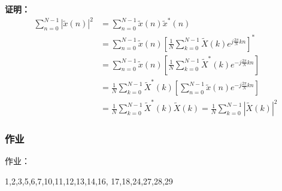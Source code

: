 \documentclass[notheorems,compress,mathserif,table]{beamer}
\begin{document}
\begin{frame}\frametitle{}%
\textbf{证明：}
\begin{equation*}
\begin{split}
\sum_{n=0}^{N-1}|\tilde{x}(n)|^{2}
&= \sum_{n=0}^{N-1}\tilde{x}(n)\tilde{x}^{*}(n)\\
&= \sum_{n=0}^{N-1}\tilde{x}(n)
\left[\frac{1}{N}\sum_{k=0}^{N-1}\tilde{X}(k)e^{j\frac{2\pi}{N}kn}\right]^{*}\\
&= \sum_{n=0}^{N-1}\tilde{x}(n)
\left[\frac{1}{N}\sum_{k=0}^{N-1}\tilde{X}^{*}(k)e^{-j\frac{2\pi}{N}kn}\right]\\
&= \frac{1}{N}\sum_{k=0}^{N-1}\tilde{X}^{*}(k)
\left[\sum_{n=0}^{N-1}\tilde{x}(n)e^{-j\frac{2\pi}{N}kn}\right]\\
&= \frac{1}{N}\sum_{k=0}^{N-1}\tilde{X}^{*}(k)\tilde{X}(k)
= \frac{1}{N}\sum_{k=0}^{N-1}|\tilde{X}(k)|^{2}
\end{split}
\end{equation*}
\end{frame}






\begin{frame}\frametitle{作业}%
作业：
\par 1,2,3,5,6,7,10,11,12,13,14,16, 17,18,24,27,28,29
\end{frame}
\end{document}
